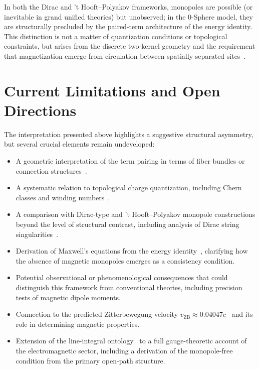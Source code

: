 \documentclass[12pt,letterpaper]{article}
\begin{document}
In both the Dirac and 't Hooft--Polyakov frameworks, monopoles are possible (or inevitable in grand unified theories) but unobserved; in the 0-Sphere model, they are structurally precluded by the paired-term architecture of the energy identity. This distinction is not a matter of quantization conditions or topological constraints, but arises from the discrete two-kernel geometry and the requirement that magnetization emerge from circulation between spatially separated sites~\cite{hanamura18356895}.


\section{Current Limitations and Open Directions}

The interpretation presented above highlights a suggestive structural asymmetry, but several crucial elements remain undeveloped:

\begin{itemize}
\item A geometric interpretation of the term pairing in terms of fiber bundles or connection structures~\cite{Nakahara2003}.
\item A systematic relation to topological charge quantization, including Chern classes and winding numbers~\cite{Nakahara2003,tHooft1974}.
\item A comparison with Dirac-type and 't Hooft--Polyakov monopole constructions beyond the level of structural contrast, including analysis of Dirac string singularities~\cite{Dirac1931,tHooft1974,Polyakov1974}.
\item Derivation of Maxwell's equations from the energy identity~\cite{hanamura18203433}, clarifying how the absence of magnetic monopoles emerges as a consistency condition.
\item Potential observational or phenomenological consequences that could distinguish this framework from conventional theories, including precision tests of magnetic dipole moments.
\item Connection to the predicted Zitterbewegung velocity $v_{\mathrm{ZB}} \approx 0.04047c$~\cite{hanamura18356895,hanamura17765409} and its role in determining magnetic properties.
\item Extension of the line-integral ontology~\cite{hanamura18275142,hanamura18203433} to a full gauge-theoretic account of the electromagnetic sector, including a derivation of the monopole-free condition from the primary open-path structure.
\end{itemize}
\end{document}
